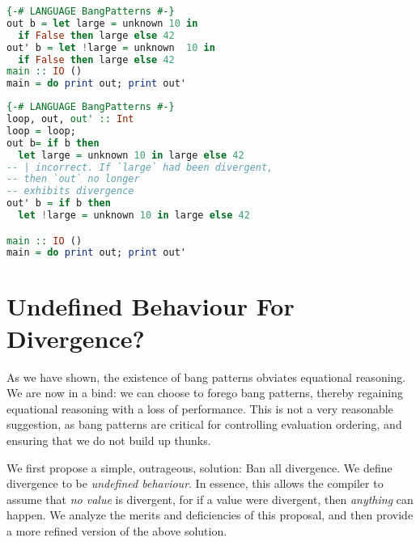 \documentclass[sigplan,\review anonymous]{acmart}
\begin{document}
\begin{lstlisting}[language=haskell, caption=Original haskell program]
{-# LANGUAGE BangPatterns #-}
out b = let large = unknown 10 in 
  if False then large else 42
out' b = let !large = unknown  10 in 
  if False then large else 42
main :: IO ()
main = do print out; print out'
\end{lstlisting}

\begin{lstlisting}[language=Haskell, caption=Correct optimization that is incorrect with a bang pattern]
{-# LANGUAGE BangPatterns #-}
loop, out, out' :: Int
loop = loop;
out b= if b then 
  let large = unknown 10 in large else 42
-- | incorrect. If `large` had been divergent, 
-- then `out` no longer
-- exhibits divergence
out' b = if b then 
  let !large = unknown 10 in large else 42

main :: IO ()
main = do print out; print out'
\end{lstlisting}




\section{Undefined Behaviour For Divergence?}

As we have shown, the existence of bang patterns obviates equational reasoning.
We are now in a bind: we can choose to forego bang patterns, thereby
regaining equational reasoning with a loss of performance. This is not a 
very reasonable suggestion, as bang patterns are critical for controlling
evaluation ordering, and ensuring that we do not build up thunks.

We first propose a simple, outrageous, solution:  Ban all divergence.
We define divergence to be \emph{undefined behaviour}. In essence, this
allows the compiler to assume that \emph{no value} is divergent, for if a
value were divergent, then \emph{anything} can happen. We analyze the
merits and deficiencies of this proposal, and then provide a more
refined version of the above solution.

\end{document}
